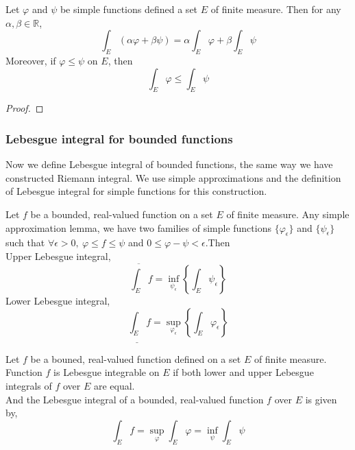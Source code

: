 \begin{theorem}
	Let $\varphi$ and $\psi$ be simple functions defined a set $E$ of finite measure.
	Then for any $\alpha,\beta \in \mathbb{R}$,
	\begin{equation}
		\int_E (\alpha\varphi + \beta\psi) = \alpha \int_E \varphi + \beta \int_E \psi
	\end{equation}
	Moreover, if $\varphi \le \psi$ on $E$, then
	\begin{equation}
		\int_E \varphi \le \int_E \psi
	\end{equation}
\end{theorem}
\begin{proof}
\end{proof}

\subsubsection{Lebesgue integral for bounded functions}
	Now we define Lebesgue integral of bounded functions, the same way we have constructed Riemann integral.
	We use simple approximations and the definition of Lebesgue integral for simple functions for this construction.
\begin{definition}
	Let $f$ be a bounded, real-valued function on a set $E$ of finite measure.
	Any simple approximation lemma, we have two families of simple functions $\{ \varphi_\epsilon\}$ and $\{ \psi_\epsilon \}$ such that $\forall \epsilon > 0,\ \varphi \le f \le \psi$ and $0 \le \varphi-\psi < \epsilon$.Then \\
	Upper Lebesgue integral,
	\begin{equation}
		\overline{\int_E} f = \inf_{\psi_\epsilon} \left\{ \int_E \psi_\epsilon \right\}
	\end{equation}
	Lower Lebesgue integral,
	\begin{equation}
		\underline{\int_E} f = \sup_{\varphi_\epsilon} \left\{ \int_E \varphi_\epsilon \right\}
	\end{equation}

\end{definition}

\begin{definition}
	Let $f$ be a bouned, real-valued function defined on a set $E$ of finite measure.
	Function $f$ is Lebesgue integrable on $E$ if both lower and upper Lebesgue integrals of $f$ over $E$ are equal.\\

	And the Lebesgue integral of a bounded, real-valued function $f$ over $E$ is given by,
	\begin{equation}
		\int_E f = \sup_\varphi \int_E \varphi = \inf_\psi \int_E \psi
	\end{equation}
\end{definition}

